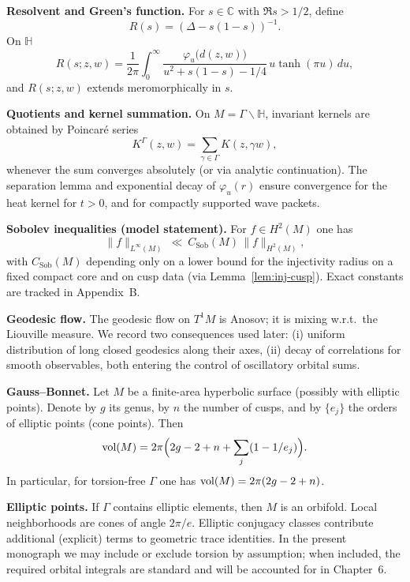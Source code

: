 \medskip

\noindent\textbf{Resolvent and Green’s function.}
For $s\in\mathbb{C}$ with $\Re s>1/2$, define
\[
  R(s)=(\Delta-s(1-s))^{-1}.
\]
On $\mathbb{H}$
\[
  R(s;z,w)=\frac{1}{2\pi}\int_{0}^{\infty}
  \frac{\varphi_{u}\bigl(d(z,w)\bigr)}{u^{2}+s(1-s)-1/4}\,u\tanh(\pi u)\,du,
\]
and $R(s;z,w)$ extends meromorphically in $s$.

\medskip

\noindent\textbf{Quotients and kernel summation.}
On $M=\Gamma\backslash\mathbb{H}$, invariant kernels are obtained by
Poincaré series
\[
  K^{\Gamma}(z,w)=\sum_{\gamma\in\Gamma} K(z,\gamma w),
\]
whenever the sum converges absolutely (or via analytic continuation).
The separation lemma and exponential decay of $\varphi_{u}(r)$ ensure convergence for the
heat kernel for $t>0$, and for compactly supported wave packets.

\medskip

\noindent\textbf{Sobolev inequalities (model statement).}
For $f\in H^{2}(M)$ one has
\[
  \|f\|_{L^{\infty}(M)}\ \ll\ C_{\mathrm{Sob}}(M)\,\|f\|_{H^{2}(M)},
\]
with $C_{\mathrm{Sob}}(M)$ depending only on a lower bound for the injectivity radius on a fixed compact core and on cusp data (via Lemma~\ref{lem:inj-cusp}). Exact constants are tracked in Appendix~B.

\medskip

\noindent\textbf{Geodesic flow.}
The geodesic flow on $T^{1}M$ is Anosov; it is mixing w.r.t.\ the Liouville measure.
We record two consequences used later:
(i) uniform distribution of long closed geodesics along their axes,
(ii) decay of correlations for smooth observables,
both entering the control of oscillatory orbital sums.


\noindent\textbf{Gauss–Bonnet.}
Let $M$ be a finite-area hyperbolic surface (possibly with elliptic points).
Denote by $g$ its genus, by $n$ the number of cusps, and by
$\{e_{j}\}$ the orders of elliptic points (cone points).
Then
\[
  \operatorname{vol}(M)=2\pi\Bigl(2g-2+n+\sum_{j}(1-1/e_{j})\Bigr).
\]
In particular, for torsion-free $\Gamma$ one has $\operatorname{vol}(M)=2\pi(2g-2+n)$.

\medskip

\noindent\textbf{Elliptic points.}
If $\Gamma$ contains elliptic elements, then $M$ is an orbifold.
Local neighborhoods are cones of angle $2\pi/e$.
Elliptic conjugacy classes contribute additional (explicit) terms to geometric trace identities.
In the present monograph we may include or exclude torsion by assumption;
when included, the required orbital integrals are standard and will be accounted for in Chapter~6.

